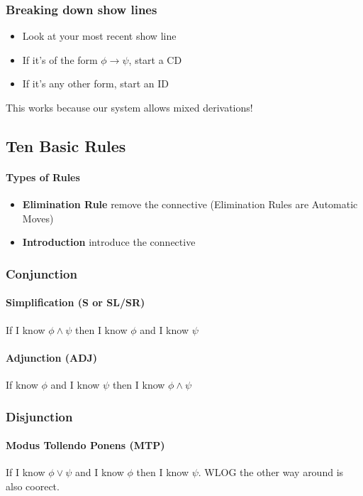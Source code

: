 \documentclass[10pt]{article}
\begin{document}
\subsubsection{Breaking down show lines}
\begin{itemize}
    \item Look at your most recent show line
    \item If it's of the form $\phi\rightarrow \psi$, start a CD 
    \item If it's any other form, start an ID
\end{itemize}
This works because our system allows mixed derivations!

\subsection{Ten Basic Rules}
\paragraph{Types of Rules}
\begin{itemize}
    \item \textbf{Elimination Rule} remove the connective (Elimination
     Rules are Automatic Moves)
    \item \textbf{Introduction} introduce the connective
\end{itemize}

\subsubsection{Conjunction}
\paragraph{Simplification (S or SL/SR)} If I know $\phi\land \psi$ then
 I know $\phi$ and I know $\psi$
\paragraph{Adjunction (ADJ)} If know $\phi$ and I know $\psi$ then I
 know $\phi\land\psi$

\subsubsection{Disjunction}
\paragraph{Modus Tollendo Ponens (MTP)} If I know $\phi \vee \psi$ and 
I know $\phi$ then I know $\psi$. WLOG the other way around is also coorect.
\end{document}
